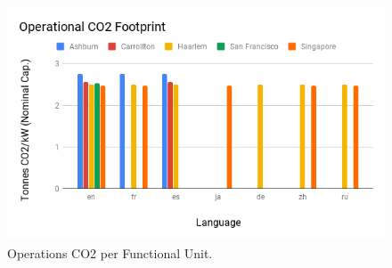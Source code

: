 \begin{figure}[h!]\centering
    \includegraphics[scale=0.65]{embodied_cost_model/images/Operational CO2 Footprint.png}
    \caption[Operations CO2 per Functional Unit]{Operations CO2 per Functional Unit.}
    \label{img: ops_co2}
\end{figure}
